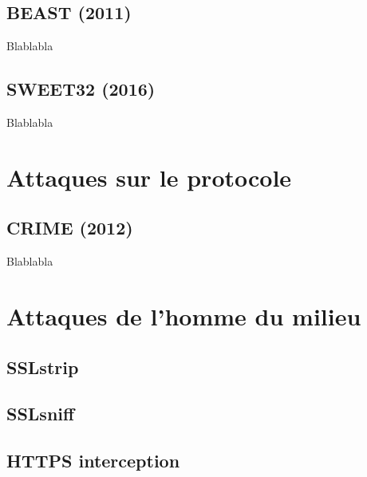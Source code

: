 \subsection{BEAST (2011)}

Blablabla \cite{beast}

\subsection{SWEET32 (2016)}

Blablabla \cite{sweet32}

\section{Attaques sur le protocole}

\subsection{CRIME (2012)}

Blablabla \cite{crime}

\section{Attaques de l'homme du milieu}

\subsection{SSLstrip}

\subsection{SSLsniff}

\subsection{HTTPS interception}
